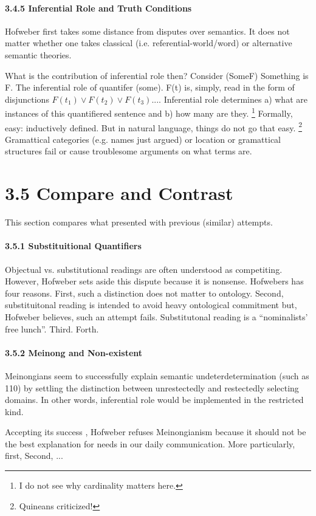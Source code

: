 \documentclass[
10pt, %
a4paper, %
twocolumn, %
landscape %
]{article}
\begin{document}
\paragraph{3.4.5 Inferential Role and Truth Conditions}
Hofweber first takes some distance from disputes over semantics. It does not matter whether one takes classical (i.e. referential-world/word) or alternative semantic theories.

What is the contribution of inferential role then?
Consider (SomeF) Something is F. The inferential role of quantifer (some).
F(t) is, simply, read in the form of  disjunctions $F(t_1) \lor F(t_2) \lor F(t_3)...$.
Inferential role determines a) what are instances of this quantifiered sentence and b) how many are they.
\footnote{I do not see why cardinality matters here. }
Formally, easy: inductively defined. But in natural language, things do not go that easy.
\footnote{Quineans criticized!}
Gramattical categories (e.g. names just argued) or location or gramattical structures fail or cause troublesome arguments on what terms are.

\section*{3.5 Compare and Contrast}
This section compares what presented with previous (similar) attempts.

\paragraph{3.5.1 Substituitional Quantifiers}
Objectual vs. substitutional readings are often understood as competiting.
However, Hofweber sets aside this dispute because it is nonsense.
Hofwebers has four reasons. First, such a distinction does not matter to ontology.
Second, substituitonal reading is intended to avoid heavy ontological commitment but, Hofweber believes, such an attempt fails. Substitutonal reading is a ``nominalists' free lunch''. Third. Forth.

\paragraph{3.5.2 Meinong and Non-existent}
Meinongians seem to successfully explain semantic undeterdetermination (such as 110) by settling the distinction between unrestectedly and restectedly selecting domains. In other words, inferential role would be implemented in the restricted kind.

Accepting its success , Hofweber refuses Meinongianism because it should not be the best explanation for needs in our daily communication.
More particularly, first,
Second, ...
\end{document}
